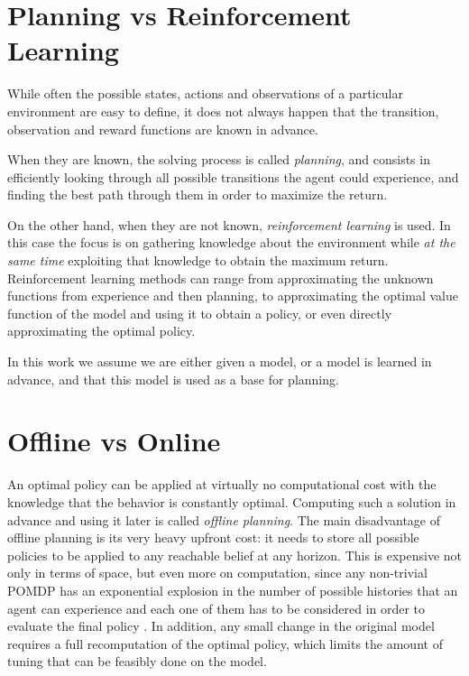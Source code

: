 \section{Planning vs Reinforcement Learning}\label{ref:solutions}

While often the possible states, actions and observations of a particular environment are easy to
define, it does not always happen that the transition, observation and reward functions are known in
advance.

When they are known, the solving process is called \textit{planning}, and consists in efficiently
looking through all possible transitions the agent could experience, and finding the best path
through them in order to maximize the return.

On the other hand, when they are not known, \textit{reinforcement learning} is used. In this case the
focus is on gathering knowledge about the environment while \textit{at the same time} exploiting that
knowledge to obtain the maximum return. Reinforcement learning methods can range from approximating
the unknown functions from experience and then planning, to approximating the optimal value function
of the model and using it to obtain a policy, or even directly approximating the optimal policy.

In this work we assume we are either given a model, or a model is learned in advance, and that this
model is used as a base for planning.


\section{Offline vs Online}

An optimal policy can be applied at virtually no computational cost with the knowledge that the
behavior is constantly optimal. Computing such a solution in advance and using it later is called
\textit{offline planning}. The main disadvantage of offline planning is its very heavy upfront cost:
it needs to store all possible policies to be applied to any reachable belief at any horizon. This
is expensive not only in terms of space, but even more on computation, since any non-trivial POMDP
has an exponential explosion in the number of possible histories that an agent can experience and
each one of them has to be considered in order to evaluate the final policy \cite{cit:pomdp}. In
addition, any small change in the original model requires a full recomputation of the optimal
policy, which limits the amount of tuning that can be feasibly done on the model.

